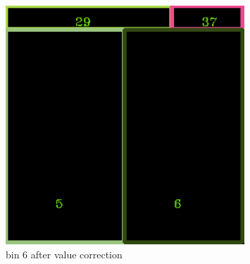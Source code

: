 \documentclass[11pt]{article}
\begin{document}
\begin{figure}
    \begin{minipage}[htb]{0.33\linewidth}
    \centering
    \includegraphics[width=0.8\textwidth]{FIGS/2/output6.png}
    \caption{bin 6 after value correction}
    \label{skyline}
    \end{minipage}
    \end{figure}
\end{document}
